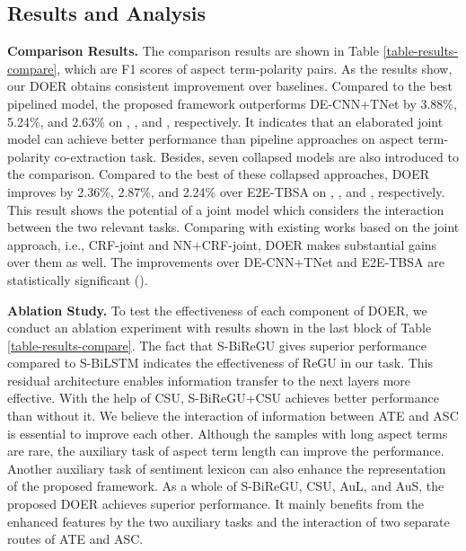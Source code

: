 \documentclass[11pt,a4paper]{article}
\begin{document}
	\subsection{Results and Analysis}
	\noindent
	\textbf{Comparison Results.} \quad The comparison results are shown in Table \ref{table-results-compare}, which are F1 scores of aspect term-polarity pairs. As the results show, our DOER obtains consistent improvement over baselines. Compared to the best pipelined model, the proposed framework outperforms DE-CNN+TNet by 3.88\%, 5.24\%, and 2.63\% on , , and , respectively. It indicates that an elaborated joint model can achieve better performance than pipeline approaches on aspect term-polarity co-extraction task. Besides, seven collapsed models are also introduced to the comparison. Compared to the best of these collapsed approaches, DOER improves by 2.36\%, 2.87\%, and 2.24\% over E2E-TBSA on , , and , respectively. This result shows the potential of a joint model which considers the interaction between the two relevant tasks. Comparing with existing works based on the joint approach, i.e., CRF-joint and NN+CRF-joint, DOER makes substantial gains over them as well. The improvements over DE-CNN+TNet and E2E-TBSA are statistically significant ().
	
	\vspace{+1.5mm}
	\noindent
	\textbf{Ablation Study.} \quad To test the effectiveness of each component of DOER, we conduct an ablation experiment with results shown in the last block of Table \ref{table-results-compare}. The fact that S-BiReGU gives superior performance compared to S-BiLSTM indicates the effectiveness of ReGU in our task. This residual architecture enables information transfer to the next layers more effective. With the help of CSU, S-BiReGU+CSU achieves better performance than without it. We believe the interaction of information between ATE and ASC is essential to improve each other. Although the samples with long aspect terms are rare, the auxiliary task of aspect term length can improve the performance. Another auxiliary task of sentiment lexicon can also enhance the representation of the proposed framework. As a whole of S-BiReGU, CSU, AuL, and AuS, the proposed DOER achieves superior performance. It mainly benefits from the enhanced features by the two auxiliary tasks and the interaction of two separate routes of ATE and ASC.
\end{document}
